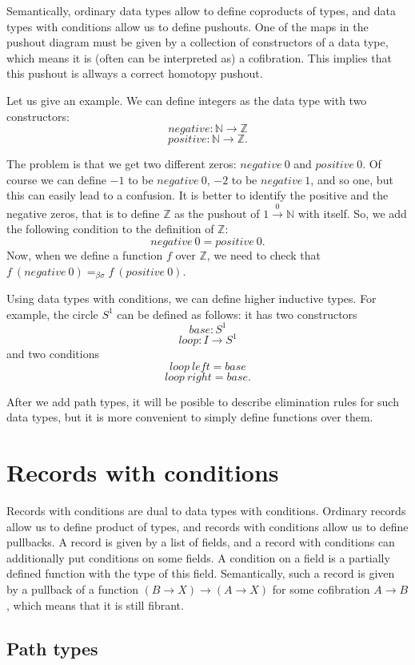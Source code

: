 \documentclass{amsart}
\theoremstyle{definition}
\theoremstyle{remark}
\numberwithin{figure}{section}
\begin{document}
Semantically, ordinary data types allow to define coproducts of types, and data types with conditions allow us to define pushouts.
One of the maps in the pushout diagram must be given by a collection of constructors of a data type, which means it is (often can be interpreted as) a cofibration.
This implies that this pushout is allways a correct homotopy pushout.

Let us give an example. We can define integers as the data type with two constructors:
\[ negative : \mathbb{N} \to \mathbb{Z} \]
\[ positive : \mathbb{N} \to \mathbb{Z}. \]

The problem is that we get two different zeros: $negative\ 0$ and $positive\ 0$.
Of course we can define $-1$ to be $negative\ 0$, $-2$ to be $negative\ 1$, and so one, but this can easily lead to a confusion.
It is better to identify the positive and the negative zeros, that is to define $\mathbb{Z}$ as the pushout of $1 \overset{0}\to \mathbb{N}$ with itself.
So, we add the following condition to the definition of $\mathbb{Z}$:
\[ negative\ 0 = positive\ 0. \]
Now, when we define a function $f$ over $\mathbb{Z}$, we need to check that $f\ (negative\ 0) =_{\beta \sigma} f\ (positive\ 0)$.

Using data types with conditions, we can define higher inductive types.
For example, the circle $S^1$ can be defined as follows: it has two constructors
\[ base : S^1 \]
\[ loop : I \to S^1 \]
and two conditions
\[ loop\ left = base \]
\[ loop\ right = base. \]

After we add path types, it will be posible to describe elimination rules for such data types,
but it is more convenient to simply define functions over them.

\section{Records with conditions}

Records with conditions are dual to data types with conditions.
Ordinary records allow us to define product of types, and records with conditions allow us to define pullbacks.
A record is given by a list of fields, and a record with conditions can additionally put conditions on some fields.
A condition on a field is a partially defined function with the type of this field.
Semantically, such a record is given by a pullback of a function $(B \to X) \to (A \to X)$ for some cofibration $A \to B$, which means that it is still fibrant.

\subsection{Path types}
\end{document}
